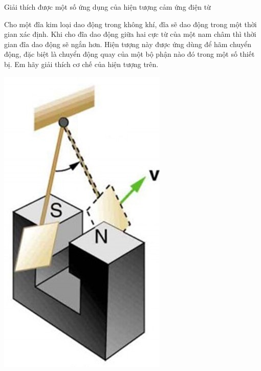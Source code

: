 \begin{dang}{Giải thích được một số ứng dụng của hiện tượng cảm ứng điện từ}
\end{dang}
\begin{vd}
		Cho một đĩa kim loại dao động trong không khí, đĩa sẽ dao động trong một thời gian xác định. Khi cho đĩa dao động giữa hai cực từ của một nam châm thì thời gian đĩa dao động sẽ ngắn hơn. Hiện tượng này được ứng dùng để hãm chuyển động, đặc biệt là chuyển động quay của một bộ phận nào đó trong một số thiết bị. Em hãy giải thích cơ chế của hiện tượng trên.
		\begin{center}
			\includegraphics[width=0.15\linewidth]{figs/VN12-Y24-PH-SYL-021-5}
		\end{center}
\end{vd}
